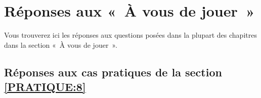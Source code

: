 

\chapter{Réponses aux « À vous de jouer »\label{annexe:reponses}}


Vous trouverez ici les réponses aux questions posées dans la plupart des chapitres dans la section « À vous de jouer ». 

\section{Réponses aux cas pratiques de la section \ref{PRATIQUE:8}\label{REPONSES:8}}
